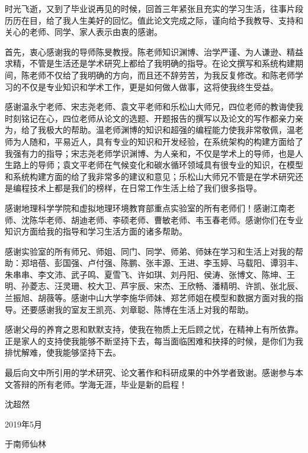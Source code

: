 \begin{acknowledgement}
时光飞逝，又到了毕业说再见的时候，回首三年紧张且充实的学习生活，往事片段历历在目，给了我人生美好的回忆。值此论文完成之际，谨向给予我教导、支持和关心的老师、同学、家人表示由衷的感谢。

首先，衷心感谢我的导师陈旻教授。陈老师知识渊博、治学严谨、为人谦逊、精益求精，不管是生活还是学术研究上都给了我明确的指导。在论文撰写和系统构建期间，陈老师不仅给了我明确的方向，而且还不辞劳苦，为我反复修改。和陈老师学习的不仅是专业知识和学术工作，更是如何做人做事，这将使我终生受益。

感谢温永宁老师、宋志尧老师、袁文平老师和乐松山大师兄，四位老师的教诲使我时刻铭记在心，四位老师从论文的选题、开题报告的撰写以及论文的写作都亲力亲为，给了我极大的帮助。温老师渊博的知识和超强的编程能力使我非常敬佩，温老师为人随和，平易近人，具有专业的知识和开发经验，在系统架构的构建方面给了我强有力的指导；宋志尧老师学识渊博、为人亲和，不仅是学术上的导师，也是人生路上的导师；袁文平老师在气候变化和碳水循环领域具有很专业的知识，在模型和系统构建方面的给了我非常多的建议和意见；乐松山大师兄不管是在学术研究还是编程技术上都是我们的榜样，在日常工作生活上给了我们很多指导。

感谢地理科学学院和虚拟地理环境教育部重点实验室的所有老师们！感谢江南老师、沈陈华老师、胡迪老师、李硕老师、曹敏老师、韦玉春老师。感谢你们在专业知识方面给我的指导和学习生活方面的诸多帮助。

感谢实验室的所有师兄、师姐、同门、同学、师弟、师妹在学习和生活上对我的帮助：郑培蓓、彭国强、卢付强、陈鹏、张丰源、王进、李玉婷、马载阳、谭羽丰、朱串串、李文沛、武子鸣、夏雪飞、许如琪、刘丹阳、侯涛、张博文、陈坤、王明、孙菱志、汪灵珊、校大卫、芦宇辰、宋杰、王欣畅、潘精明、许凯、张北辰、兰振旭、胡薇等。感谢中山大学李施华师妹、郑艺师姐在模型和数据方面对我的指导。还要感谢我的室友王凯亮、刘章聪、陈博在生活上对我的帮助。

感谢父母的养育之恩和默默支持，使我在物质上无后顾之忧，在精神上有所依靠。正是家人的支持使我能够不断坚持下去，每当面临困难和抉择的时候，是你们为我排忧解难，使我能够坚持下去。

最后向文中所引用的学术研究、论文著作和科研成果的中外学者致谢。感谢参与本文答辩的所有老师。学海无涯，毕业是新的启程！

\begin{flushright}
沈超然 \hspace{.4cm}

2019年5月

于南师仙林 \hspace{.05cm}
\end{flushright}

\end{acknowledgement}
